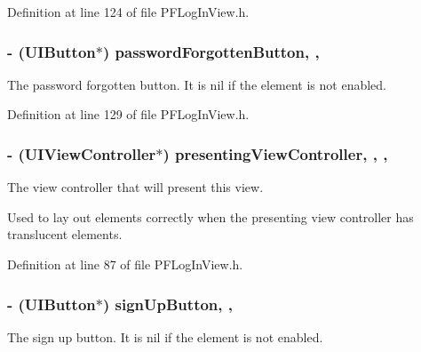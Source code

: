 Definition at line 124 of file P\+F\+Log\+In\+View.\+h.

\hypertarget{interface_p_f_log_in_view_a15c2c32b5a78348e75399cedb99b6968}{}
\subsubsection[{password\+Forgotten\+Button}]{\setlength{\rightskip}{0pt plus 5cm}-\/ (U\+I\+Button$\ast$) password\+Forgotten\+Button\hspace{0.3cm}{\ttfamily [read]}, {\ttfamily [nonatomic]}, {\ttfamily [strong]}}\label{interface_p_f_log_in_view_a15c2c32b5a78348e75399cedb99b6968}
The password forgotten button. It is {\ttfamily nil} if the element is not enabled. 

Definition at line 129 of file P\+F\+Log\+In\+View.\+h.

\hypertarget{interface_p_f_log_in_view_a9743c6a9acbb86749fe2dc6d50447552}{}
\subsubsection[{presenting\+View\+Controller}]{\setlength{\rightskip}{0pt plus 5cm}-\/ (U\+I\+View\+Controller$\ast$) presenting\+View\+Controller\hspace{0.3cm}{\ttfamily [read]}, {\ttfamily [write]}, {\ttfamily [nonatomic]}, {\ttfamily [weak]}}\label{interface_p_f_log_in_view_a9743c6a9acbb86749fe2dc6d50447552}
The view controller that will present this view.

Used to lay out elements correctly when the presenting view controller has translucent elements. 

Definition at line 87 of file P\+F\+Log\+In\+View.\+h.

\hypertarget{interface_p_f_log_in_view_aca49da3d4d6b0e7aa6264953dc74f47a}{}
\subsubsection[{sign\+Up\+Button}]{\setlength{\rightskip}{0pt plus 5cm}-\/ (U\+I\+Button$\ast$) sign\+Up\+Button\hspace{0.3cm}{\ttfamily [read]}, {\ttfamily [nonatomic]}, {\ttfamily [strong]}}\label{interface_p_f_log_in_view_aca49da3d4d6b0e7aa6264953dc74f47a}
The sign up button. It is {\ttfamily nil} if the element is not enabled. 

